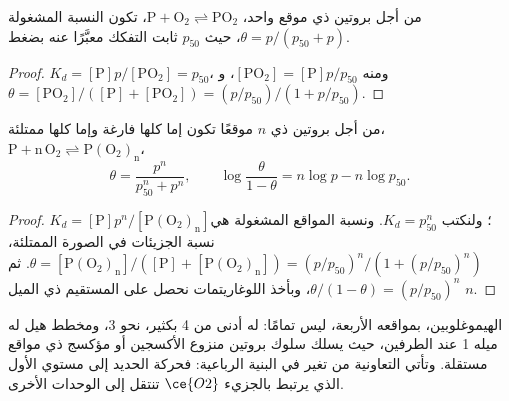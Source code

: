 \begin{proposition}\label{prop:b3:bioinorganic:hyperbola}
من أجل بروتين ذي موقع واحد، $\mathrm{P + O_2 \rightleftharpoons PO_2}$، تكون النسبة المشغولة $\theta = p/(p_{50} + p)$، حيث $p_{50}$
ثابت التفكك معبَّرًا عنه بضغط.
\end{proposition}

\begin{proof}
$K_d = [\mathrm P]p/[\mathrm{PO_2}] = p_{50}$، ومنه $[\mathrm{PO_2}] = [\mathrm P]p/p_{50}$، و$\theta = [\mathrm{PO_2}]/([\mathrm P] + [\mathrm{PO_2}]) = (p/p_{50})/(1 + p/p_{50})$.
\end{proof}

\begin{theorem}\label{thm:b3:bioinorganic:hill}
من أجل بروتين ذي $n$ موقعًا تكون إما كلها فارغة وإما كلها ممتلئة،
$\mathrm{P + n\,O_2 \rightleftharpoons P(O_2)_n}$،
\[
  \theta = \frac{p^n}{p_{50}^n + p^n}, \qquad \log\frac{\theta}{1 - \theta} = n\log p - n\log p_{50}.
\]
\end{theorem}

\begin{proof}
$K_d = [\mathrm P]p^n/[\mathrm{P(O_2)_n}]$؛ ولنكتب $K_d = p_{50}^n$. ونسبة المواقع المشغولة هي نسبة الجزيئات
في الصورة الممتلئة، $\theta = [\mathrm{P(O_2)_n}]/([\mathrm P] + [\mathrm{P(O_2)_n}]) = (p/p_{50})^n/(1 + (p/p_{50})^n)$. ثم $\theta/(1 - \theta) = (p/p_{50})^n$، وبأخذ
اللوغاريتمات نحصل على المستقيم ذي الميل $n$.
\end{proof}

الهيموغلوبين، بمواقعه الأربعة، ليس  تمامًا:  له
أدنى من 4 بكثير، نحو 3، ومخطط هيل له ميله 1 عند الطرفين، حيث
يسلك سلوك بروتين منزوع الأكسجين أو مؤكسج ذي مواقع مستقلة. 
وتأتي التعاونية من تغير في البنية الرباعية: فحركة
الحديد إلى مستوي  الأول الذي يرتبط بالجزيء $\ce{O2}$ تنتقل إلى الوحدات الأخرى.

